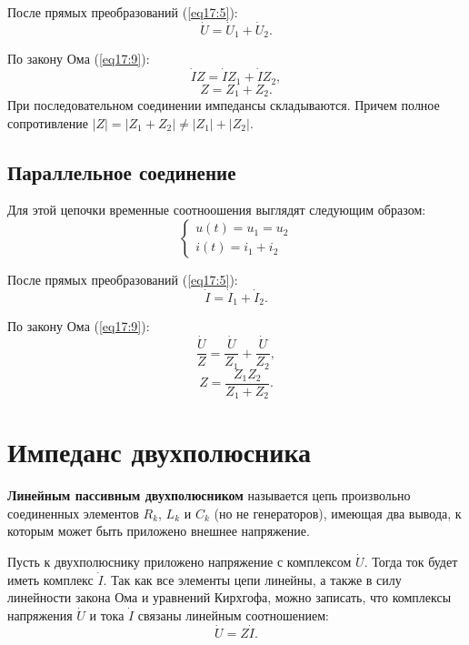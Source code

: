         После прямых преобразований (\ref{eq17:5}):
        \[
            \dot{U} = \dot{U}_1 + \dot{U}_2.
        \]
        
        По закону Ома (\ref{eq17:9}):
        \[
            \dot{I}Z = \dot{I}Z_1 + \dot{I}Z_2,
        \]
        \[
            Z = Z_1 + Z_2.
        \]
        При последовательном соединении импедансы складываются. Причем полное
        сопротивление \( |Z| = |Z_1 + Z_2| \ne |Z_1| + |Z_2| \).
    
    \subsection{Параллельное соединение}
        
        Для этой цепочки временные соотноошения выглядят следующим образом:
        \[
            \left\{
            \begin{array}{l}
                u(t) = u_1 = u_2 \\
                i(t) = i_1 + i_2
            \end{array}
            \right.
        \]

        После прямых преобразований (\ref{eq17:5}):
        \[
            \dot{I} = \dot{I}_1 + \dot{I}_2.
        \]
        
        По закону Ома (\ref{eq17:9}):
        \[
            \frac{\dot{U}}{Z} = \frac{\dot{U}}{Z_1} + \frac{\dot{U}}{Z_2},
        \]
        \[
            Z = \frac{Z_1Z_2}{Z_1 + Z_2}.
        \]
    
\section{Импеданс двухполюсника}

    \begin{definition}
        \textbf{Линейным пассивным двухполюсником} называется цепь произвольно
        соединенных элементов \( R_k \), \( L_k \) и \( C_k \) (но не
        генераторов), имеющая два вывода, к которым может быть приложено внешнее
        напряжение.
    \end{definition}
    
    Пусть к двухполюснику приложено напряжение с комплексом \( \dot{U} \). Тогда
    ток будет иметь комплекс \( \dot{I} \). Так как все элементы цепи линейны,
    а также в силу линейности закона Ома и уравнений Кирхгофа, можно записать,
    что комплексы напряжения \( \dot{U} \) и тока \( \dot{I} \) связаны линейным
    соотношением:
    \begin{equation}
        \dot{U} = Z\dot{I}.
        \label{eq17:n1}
    \end{equation}
    
